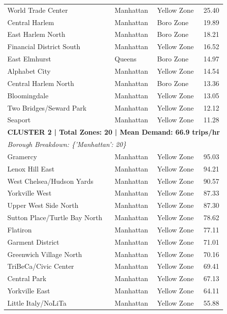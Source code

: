 \documentclass[11pt,a4paper]{article}
\begin{document}
\begin{table}[htbp]
\begin{tabular}{lllc}
        World Trade Center & Manhattan & Yellow Zone & 25.40 \\
        Central Harlem & Manhattan & Boro Zone & 19.89 \\
        East Harlem North & Manhattan & Boro Zone & 18.21 \\
        Financial District South & Manhattan & Yellow Zone & 16.52 \\
        East Elmhurst & Queens & Boro Zone & 14.97 \\
        Alphabet City & Manhattan & Yellow Zone & 14.54 \\
        Central Harlem North & Manhattan & Boro Zone & 13.36 \\
        Bloomingdale & Manhattan & Yellow Zone & 13.05 \\
        Two Bridges/Seward Park & Manhattan & Yellow Zone & 12.12 \\
        Seaport & Manhattan & Yellow Zone & 11.28 \\
        \midrule
        \multicolumn{4}{l}{\textbf{CLUSTER 2 | Total Zones: 20 | Mean Demand: 66.9 trips/hr}} \\
        \multicolumn{4}{l}{\textit{Borough Breakdown: \{'Manhattan': 20\}}} \\
        \midrule
        Gramercy & Manhattan & Yellow Zone & 95.03 \\
        Lenox Hill East & Manhattan & Yellow Zone & 94.21 \\
        West Chelsea/Hudson Yards & Manhattan & Yellow Zone & 90.57 \\
        Yorkville West & Manhattan & Yellow Zone & 87.33 \\
        Upper West Side North & Manhattan & Yellow Zone & 87.30 \\
        Sutton Place/Turtle Bay North & Manhattan & Yellow Zone & 78.62 \\
        Flatiron & Manhattan & Yellow Zone & 77.11 \\
        Garment District & Manhattan & Yellow Zone & 71.01 \\
        Greenwich Village North & Manhattan & Yellow Zone & 70.16 \\
        TriBeCa/Civic Center & Manhattan & Yellow Zone & 69.41 \\
        Central Park & Manhattan & Yellow Zone & 67.13 \\
        Yorkville East & Manhattan & Yellow Zone & 64.11 \\
        Little Italy/NoLiTa & Manhattan & Yellow Zone & 55.88 \\

\end{tabular}
\end{table}
\end{document}
